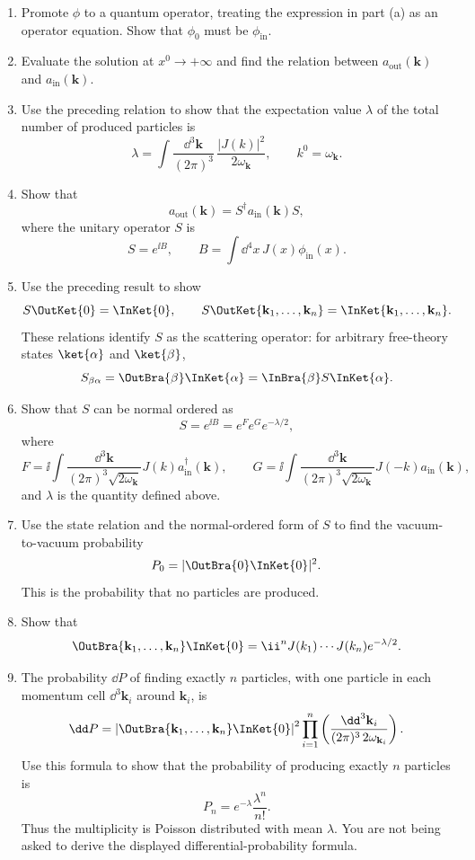 \begin{enumerate}
\begin{enumerate}
\item Promote \(\phi\) to a quantum operator, treating the expression in
part (a) as an operator equation.  Show that \(\phi_0\) must be
\(\phi_{\mathrm{in}}\).

\item Evaluate the solution at \(x^0\to+\infty\) and find the relation between
\(a_{\mathrm{out}}(\mathbf k)\) and \(a_{\mathrm{in}}(\mathbf k)\).

\item Use the preceding relation to show that the expectation value
\(\lambda\) of the total number of produced particles is
\[
 \lambda=\int\frac{\dd^3\mathbf k}{(2\pi)^3}\,
 \frac{|J(k)|^2}{2\omega_{\mathbf k}},
 \qquad k^0=\omega_{\mathbf k}.
\]

\item Show that
\[
 a_{\mathrm{out}}(\mathbf k)=S^\dagger
 a_{\mathrm{in}}(\mathbf k)S,
\]
where the unitary operator \(S\) is
\[
 S=e^{\ii B},\qquad B=\int \dd^4x\,J(x)\phi_{\mathrm{in}}(x).
\]

\item Use the preceding result to show
\[
 S\OutKet{0}=\InKet{0},
 \qquad
 S\OutKet{\mathbf k_1,\ldots,\mathbf k_n}
 =\InKet{\mathbf k_1,\ldots,\mathbf k_n}.
\]
These relations identify \(S\) as the scattering operator: for arbitrary
free-theory states \(\ket{\alpha}\) and \(\ket{\beta}\),
\[
 S_{\beta\alpha}
 =\OutBra{\beta}\InKet{\alpha}
 =\InBra{\beta}S\InKet{\alpha}.
\]

\item Show that \(S\) can be normal ordered as
\[
 S=e^{\ii B}=e^F e^G e^{-\lambda/2},
\]
where
\[
 F=\ii\int\frac{\dd^3\mathbf k}{(2\pi)^3\sqrt{2\omega_{\mathbf k}}}
 J(k)a_{\mathrm{in}}^\dagger(\mathbf k),
 \qquad
 G=\ii\int\frac{\dd^3\mathbf k}{(2\pi)^3\sqrt{2\omega_{\mathbf k}}}
 J(-k)a_{\mathrm{in}}(\mathbf k),
\]
and \(\lambda\) is the quantity defined above.

\item Use the state relation and the normal-ordered form of \(S\) to find the
vacuum-to-vacuum probability
\[
 P_0=|\OutBra{0}\InKet{0}|^2.
\]
This is the probability that no particles are produced.

\item Show that
\[
 \OutBra{\mathbf k_1,\ldots,\mathbf k_n}\InKet{0}
 =\ii^nJ(k_1)\cdots J(k_n)e^{-\lambda/2}.
\]

\item The probability \(\dd P\) of finding exactly \(n\) particles, with one
particle in each momentum cell \(\dd^3\mathbf k_i\) around \(\mathbf k_i\), is
\[
 \dd P=
 \left|\OutBra{\mathbf k_1,\ldots,\mathbf k_n}\InKet{0}\right|^2
 \prod_{i=1}^n
 \left(\frac{\dd^3\mathbf k_i}{(2\pi)^3\,2\omega_{\mathbf k_i}}\right).
\]
Use this formula to show that the probability of producing exactly \(n\)
particles is
\[
 P_n=e^{-\lambda}\frac{\lambda^n}{n!}.
\]
Thus the multiplicity is Poisson distributed with mean \(\lambda\).
You are not being asked to derive the displayed differential-probability
formula.
\end{enumerate}


\end{enumerate}
